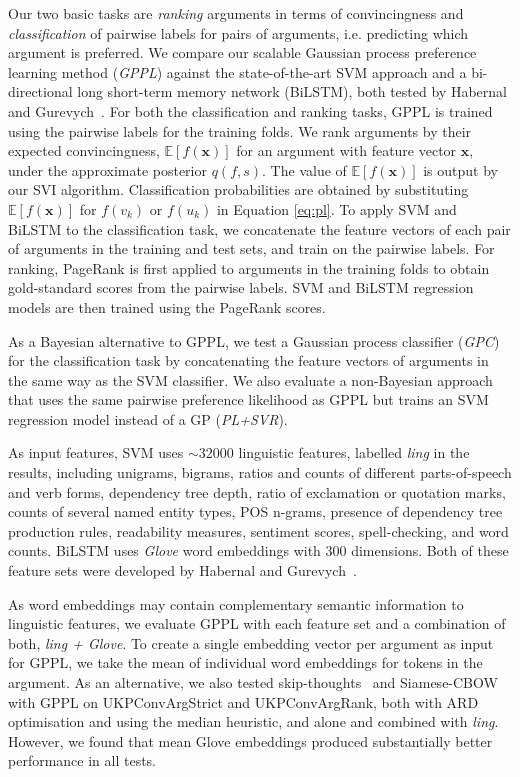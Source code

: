 Our two basic tasks are \emph{ranking} arguments in terms of convincingness and  
\emph{classification} of pairwise labels for pairs of arguments, i.e. predicting which argument is preferred. 
We compare our scalable Gaussian process preference learning method (\emph{GPPL}) against 
the state-of-the-art SVM approach and a bi-directional long short-term memory network (BiLSTM),
both tested by Habernal and Gurevych~.
For both the classification and ranking tasks, GPPL is trained using the pairwise labels for the training folds.
We rank arguments by their expected convincingness, $\mathbb{E}[f(\mathbf{x})]$ for an argument 
with feature vector $\mathbf{x}$, under the approximate posterior $q(f,s)$.
The value of $\mathbb{E}[f(\mathbf{x})]$ is output by our SVI algorithm.
Classification probabilities are obtained by substituting $\mathbb{E}[f(\mathbf{x})]$ for 
$f(v_k)$ or $f(u_k)$ in Equation \ref{eq:pl}.
To apply SVM and BiLSTM to the classification task, we concatenate the feature vectors of each pair of arguments in the training and test sets, and train on the pairwise labels.
For ranking, PageRank is first applied to arguments in the training folds to obtain gold-standard scores from the pairwise labels. SVM and BiLSTM regression models are then trained using the PageRank scores.

As a Bayesian alternative to GPPL, 
we test a Gaussian process classifier (\emph{GPC}) for the classification task 
by concatenating the feature vectors of arguments in the same way as the SVM classifier.
We also evaluate a non-Bayesian approach that uses the same pairwise preference likelihood as GPPL
but trains an SVM regression model instead of a GP (\emph{PL+SVR}).

As input features, SVM uses $\sim32000$ linguistic features, labelled \emph{ling} in the results, 
including unigrams, bigrams, ratios and counts of different parts-of-speech and verb forms,
dependency tree depth, ratio of exclamation or quotation marks, 
counts of several named entity types, POS n-grams,
presence of dependency tree production rules, readability measures,
sentiment scores, spell-checking, and word counts.
BiLSTM uses \emph{Glove} word embeddings with 300 dimensions. Both of these feature sets were
developed by Habernal and Gurevych~.

As word embeddings may contain complementary semantic information to linguistic features,
we evaluate GPPL with each feature set and a combination of both, \emph{ling + Glove}.
To create a single embedding vector per argument as input for GPPL,
we take the mean of individual word embeddings for tokens in the argument.
As an alternative,
we also tested skip-thoughts~\cite{kiros2015skip} and Siamese-CBOW~\cite{kenter2016siamesecbow} 
with GPPL on UKPConvArgStrict and UKPConvArgRank, both with ARD optimisation and using the median heuristic,
and alone and combined with \emph{ling}. 
However, we found that mean Glove embeddings produced substantially better performance in all tests.

